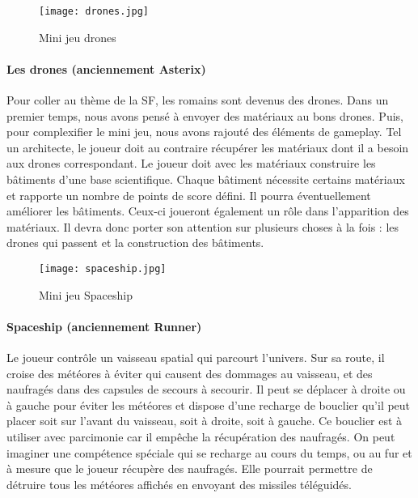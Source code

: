 \begin{wrapfigure}[11]{l}{6cm}
    \vspace{-25pt}
    \begin{center}
    \texttt{[image: drones.jpg]}
    \end{center}
    \captionsetup{labelformat=simpleNumber}
    \caption{Mini jeu drones}
\label{Drones}
\end{wrapfigure}

\paragraph{Les drones (anciennement Asterix)} Pour coller au thème de la \gls{SF}, les romains sont devenus des drones. Dans un premier temps, nous avons pensé à envoyer des matériaux
au bons drones. Puis, pour complexifier le mini jeu, nous avons rajouté des éléments de gameplay. Tel un architecte, le joueur doit au contraire récupérer les matériaux dont
il a besoin aux drones correspondant. Le joueur doit avec les matériaux construire les bâtiments d'une base scientifique. Chaque bâtiment nécessite certains matériaux et rapporte un
nombre de points de score défini. Il pourra éventuellement améliorer les bâtiments. Ceux-ci joueront également un rôle dans l'apparition des matériaux. Il devra donc porter son
attention sur plusieurs choses à la fois : les drones qui passent et la construction des bâtiments.

\newpage

\begin{wrapfigure}[17]{l}{6cm}
    \vspace{-10pt}
    \begin{center}
    \texttt{[image: spaceship.jpg]}
    \end{center}
    \captionsetup{labelformat=simpleNumber}
    \caption{Mini jeu Spaceship}
\label{Spaceship}
\end{wrapfigure}

\paragraph{Spaceship (anciennement Runner)}Le joueur contrôle un vaisseau spatial qui parcourt l'univers. Sur sa route, il croise des météores à éviter qui causent des dommages au
vaisseau, et des naufragés dans des capsules de secours à secourir. Il peut se déplacer à droite ou à gauche pour éviter les météores et dispose d'une recharge de bouclier qu'il peut
placer soit sur l'avant du vaisseau, soit à droite, soit à gauche. Ce bouclier est à utiliser avec parcimonie car il empêche la récupération des naufragés. On peut imaginer une
compétence spéciale qui se recharge au cours du temps, ou au fur et à mesure que le joueur récupère des naufragés. Elle pourrait permettre de détruire tous les météores affichés en
envoyant des missiles téléguidés.


